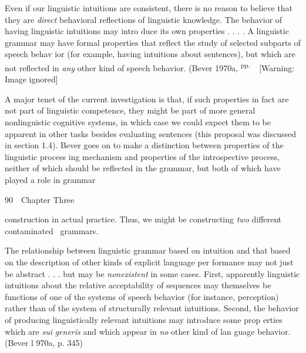 \begin{styleTextbody}
Even if our linguistic intuitions are consistent, there is no reason to believe that they are \textit{direct}\textit{ }behavioral reflections of linguistic knowledge. The behavior of having linguistic intuitions may intro\- duce its own properties . . . . A linguistic grammar may have formal properties that reflect the study of selected subparts of speech behav\- ior (for example, having intuitions about sentences), but which are not reflected in \textit{any}\textit{ }other kind of speech behavior. (Bever 1970a, \textsuperscript{pp. }\textsuperscript{\ }  [Warning: Image ignored] %
 
\end{styleTextbody}


\begin{styleTextbody}
A major tenet of the current investigation is that, if such properties in fact are not part of linguistic competence, they might be part of more general nonlinguistic cognitive systems, in which case we could expect them to be apparent in other tasks besides evaluating sentences (this proposal was discussed in section 1.4). Bever goes on to make a distinction between properties of the linguistic process\- ing mechanism and properties of the introspective process, neither of which should be reflected in the grammar, but both of which have played a role in grammar
\end{styleTextbody}


\clearpage\setcounter{page}{1}\begin{styleStandard}
90\ \ Chapter Three
\end{styleStandard}


\begin{styleStandard}
construction in actual practice. Thus, we might be constructing \textit{two}\textit{ }different {\textquotedbl}contaminated{\textquotedbl} \ grammars.
\end{styleStandard}


\begin{styleStandard}
The relationship between linguistic grammar based on intuition and that based on the description of other kinds of explicit language per\- formance may not just be {\textquotedbl}abstract{\textquotedbl} . . . but may be \textit{nonexistent}\textit{ }in some cases. First, apparently {\textquotedbl}linguistic{\textquotedbl} intuitions about the relative acceptability of sequences may themselves be functions of one of the systems of speech behavior (for instance, perception) rather than of the system of structurally relevant intuitions. Second, the behavior of producing linguistically relevant intuitions may introduce some prop\- erties which are \textit{sui}\textit{ }\textit{generis}\textit{ }and which appear in \textit{no}\textit{ }other kind of lan\- guage behavior. (Bever l 970a, p. 345)
\end{styleStandard}


